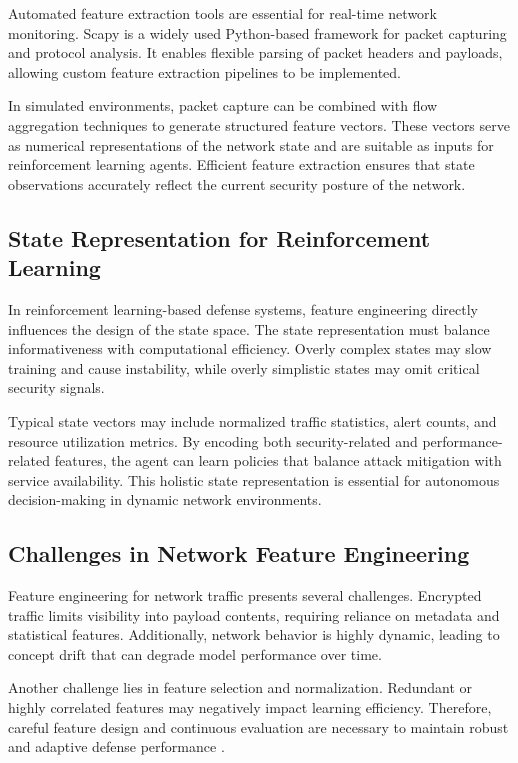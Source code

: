 \documentclass[12pt,a4paper]{report}
\begin{document}
Automated feature extraction tools are essential for real-time network monitoring.
Scapy is a widely used Python-based framework for packet capturing and protocol analysis.
It enables flexible parsing of packet headers and payloads, allowing custom feature extraction pipelines to be implemented.

In simulated environments, packet capture can be combined with flow aggregation techniques to generate structured feature vectors.
These vectors serve as numerical representations of the network state and are suitable as inputs for reinforcement learning agents.
Efficient feature extraction ensures that state observations accurately reflect the current security posture of the network.

\subsection{State Representation for Reinforcement Learning}

In reinforcement learning-based defense systems, feature engineering directly influences the design of the state space.
The state representation must balance informativeness with computational efficiency.
Overly complex states may slow training and cause instability, while overly simplistic states may omit critical security signals.

Typical state vectors may include normalized traffic statistics, alert counts, and resource utilization metrics.
By encoding both security-related and performance-related features, the agent can learn policies that balance attack mitigation with service availability.
This holistic state representation is essential for autonomous decision-making in dynamic network environments.

\subsection{Challenges in Network Feature Engineering}

Feature engineering for network traffic presents several challenges.
Encrypted traffic limits visibility into payload contents, requiring reliance on metadata and statistical features.
Additionally, network behavior is highly dynamic, leading to concept drift that can degrade model performance over time.

Another challenge lies in feature selection and normalization.
Redundant or highly correlated features may negatively impact learning efficiency.
Therefore, careful feature design and continuous evaluation are necessary to maintain robust and adaptive defense performance \cite{scapy2007,flowFeatureSurvey2020}.
\end{document}
